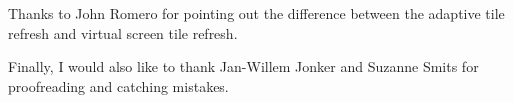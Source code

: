 Thanks to John Romero for pointing out the difference between the adaptive tile refresh and virtual screen tile refresh.\\

\par
Finally, I would also like to thank Jan-Willem Jonker and Suzanne Smits for proofreading and catching mistakes.\\

\par


\thispagestyle{plain} %
